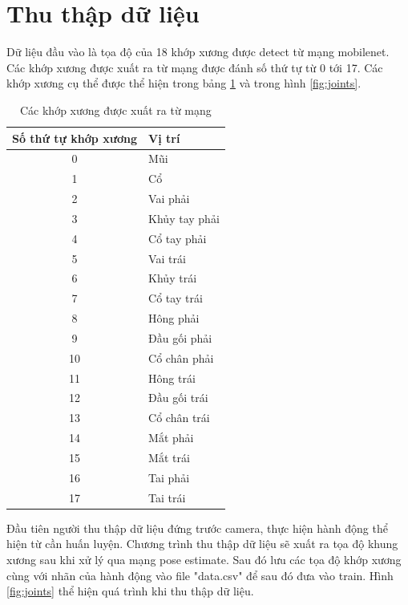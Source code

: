 \section{Thu thập dữ liệu}
Dữ liệu đầu vào là tọa độ của 18 khớp xương được detect từ mạng mobilenet. Các khớp xương được xuất ra từ mạng được đánh số thứ tự từ 0 tới 17. Các khớp xương cụ thể được thể hiện trong bảng \ref{table:joints} và trong hình \ref{fig:joints}.


\begin{table}[h]
\caption{Các khớp xương được xuất ra từ mạng}
\label{table:joints}
\centering
\begin{center}
\begin{tabular}{|c|p{9cm}|} 
 \hline
Số thứ tự khớp xương  & Vị trí \\
 \hline
 0 & Mũi\\
 \hline 
 1 & Cổ\\
 \hline 
 2 & Vai phải\\
 \hline
 3 & Khủy tay phải \\
 \hline 
 4 & Cổ tay phải\\
 \hline
 5 & Vai trái\\
 \hline
 6 & Khủy trái\\
 \hline
 7 & Cổ tay trái\\
 \hline
 8 & Hông phải\\
 \hline
 9 & Đầu gối phải\\
 \hline
 10 & Cổ chân phải\\
 \hline
 11 & Hông trái\\
 \hline
 12 & Đầu gối trái\\
 \hline
 13 & Cổ chân trái\\
 \hline
 14 & Mắt phải\\
 \hline
 15 & Mắt trái\\
 \hline
 16 & Tai phải\\
 \hline
 17 & Tai trái\\
 \hline
\end{tabular}
\end{center}
\end{table}

Đầu tiên người thu thập dữ liệu đứng trước camera, thực hiện hành động thể hiện từ cần huấn luyện. Chương trình thu thập dữ liệu sẽ xuất ra tọa độ khung xương sau khi xử lý qua mạng pose estimate. Sau đó lưu các tọa độ khớp xương cùng với nhãn của hành động vào file "data.csv" để sau đó đưa vào train. Hình \ref{fig:joints} thể hiện quá trình khi thu thập dữ liệu.


